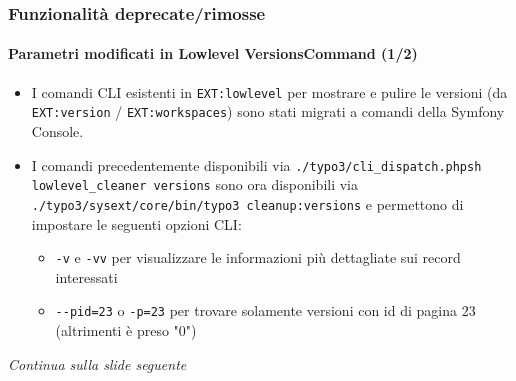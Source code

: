 \begin{frame}[fragile]
	\frametitle{Funzionalità deprecate/rimosse}
	\framesubtitle{Parametri modificati in Lowlevel VersionsCommand (1/2)}

	\begin{itemize}
		\item I comandi CLI esistenti in \texttt{EXT:lowlevel} per mostrare e pulire le versioni (da
			\texttt{EXT:version} / \texttt{EXT:workspaces}) sono stati migrati a comandi della Symfony Console.

		\item I comandi precedentemente disponibili via \texttt{./typo3/cli\_dispatch.phpsh lowlevel\_cleaner versions}
			sono ora disponibili via \texttt{./typo3/sysext/core/bin/typo3 cleanup:versions} e permettono di impostare
			le seguenti opzioni CLI:

			\begin{itemize}
				\item \texttt{-v} e \texttt{-vv} per visualizzare le informazioni più dettagliate sui record interessati
				\item \texttt{-}\texttt{-pid=23} o \texttt{-p=23} per trovare solamente versioni con id di pagina 23 (altrimenti è preso "0")
			\end{itemize}

	\end{itemize}

	\small\textit{Continua sulla slide seguente}\normalsize

\end{frame}



